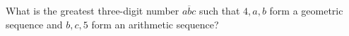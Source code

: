 What is the greatest three-digit number $\overline{abc}$ such that $4,a,b$ form a geometric sequence and $b,c,5$ form an arithmetic sequence?
